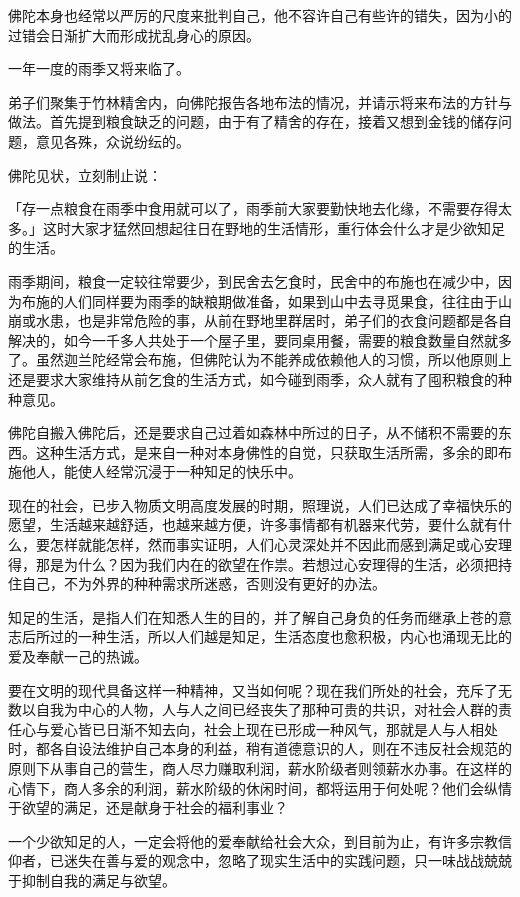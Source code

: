 \documentclass[twoside,openany]{book}
\begin{document}
佛陀本身也经常以严厉的尺度来批判自己，他不容许自己有些许的错失，因为小的过错会日渐扩大而形成扰乱身心的原因。

一年一度的雨季又将来临了。

弟子们聚集于竹林精舍内，向佛陀报告各地布法的情况，并请示将来布法的方针与做法。首先提到粮食缺乏的问题，由于有了精舍的存在，接着又想到金钱的储存问题，意见各殊，众说纷纭的。

佛陀见状，立刻制止说：

「存一点粮食在雨季中食用就可以了，雨季前大家要勤快地去化缘，不需要存得太多。」这时大家才猛然回想起往日在野地的生活情形，重行体会什么才是少欲知足的生活。

雨季期间，粮食一定较往常要少，到民舍去乞食时，民舍中的布施也在减少中，因为布施的人们同样要为雨季的缺粮期做准备，如果到山中去寻觅果食，往往由于山崩或水患，也是非常危险的事，从前在野地里群居时，弟子们的衣食问题都是各自解决的，如今一千多人共处于一个屋子里，要同桌用餐，需要的粮食数量自然就多了。虽然迦兰陀经常会布施，但佛陀认为不能养成依赖他人的习惯，所以他原则上还是要求大家维持从前乞食的生活方式，如今碰到雨季，众人就有了囤积粮食的种种意见。

佛陀自搬入佛陀后，还是要求自己过着如森林中所过的日子，从不储积不需要的东西。这种生活方式，是来自一种对本身佛性的自觉，只获取生活所需，多余的即布施他人，能使人经常沉浸于一种知足的快乐中。

现在的社会，已步入物质文明高度发展的时期，照理说，人们已达成了幸福快乐的愿望，生活越来越舒适，也越来越方便，许多事情都有机器来代劳，要什么就有什么，要怎样就能怎样，然而事实证明，人们心灵深处并不因此而感到满足或心安理得，那是为什么？因为我们内在的欲望在作祟。若想过心安理得的生活，必须把持住自己，不为外界的种种需求所迷惑，否则没有更好的办法。

知足的生活，是指人们在知悉人生的目的，并了解自己身负的任务而继承上苍的意志后所过的一种生活，所以人们越是知足，生活态度也愈积极，内心也涌现无比的爱及奉献一己的热诚。

要在文明的现代具备这样一种精神，又当如何呢？现在我们所处的社会，充斥了无数以自我为中心的人物，人与人之间已经丧失了那种可贵的共识，对社会人群的责任心与爱心皆已日渐不知去向，社会上现在已形成一种风气，那就是人与人相处时，都各自设法维护自己本身的利益，稍有道德意识的人，则在不违反社会规范的原则下从事自己的营生，商人尽力赚取利润，薪水阶级者则领薪水办事。在这样的心情下，商人多余的利润，薪水阶级的休闲时间，都将运用于何处呢？他们会纵情于欲望的满足，还是献身于社会的福利事业？

一个少欲知足的人，一定会将他的爱奉献给社会大众，到目前为止，有许多宗教信仰者，已迷失在善与爱的观念中，忽略了现实生活中的实践问题，只一味战战兢兢于抑制自我的满足与欲望。
\end{document}
